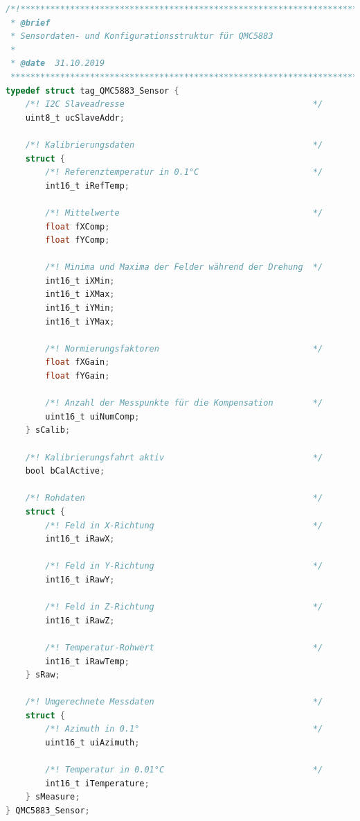             \begin{lstlisting}[language=C,caption={Typdefinition für die Sensordatenstruktur des QMC5883L},label=lst:qmc5883_typedef]
/*!****************************************************************************
 * @brief
 * Sensordaten- und Konfigurationsstruktur für QMC5883
 *
 * @date  31.10.2019
 ******************************************************************************/
typedef struct tag_QMC5883_Sensor {
    /*! I2C Slaveadresse                                      */
    uint8_t ucSlaveAddr;
    
    /*! Kalibrierungsdaten                                    */
    struct {
        /*! Referenztemperatur in 0.1°C                       */
        int16_t iRefTemp;
        
        /*! Mittelwerte                                       */
        float fXComp;
        float fYComp;
        
        /*! Minima und Maxima der Felder während der Drehung  */
        int16_t iXMin;
        int16_t iXMax;
        int16_t iYMin;
        int16_t iYMax;
        
        /*! Normierungsfaktoren                               */
        float fXGain;
        float fYGain;
        
        /*! Anzahl der Messpunkte für die Kompensation        */
        uint16_t uiNumComp;
    } sCalib;
    
    /*! Kalibrierungsfahrt aktiv                              */
    bool bCalActive;
    
    /*! Rohdaten                                              */
    struct {
        /*! Feld in X-Richtung                                */
        int16_t iRawX;
        
        /*! Feld in Y-Richtung                                */
        int16_t iRawY;
        
        /*! Feld in Z-Richtung                                */
        int16_t iRawZ;
        
        /*! Temperatur-Rohwert                                */
        int16_t iRawTemp;
    } sRaw;
    
    /*! Umgerechnete Messdaten                                */
    struct {
        /*! Azimuth in 0.1°                                   */
        uint16_t uiAzimuth;
        
        /*! Temperatur in 0.01°C                              */
        int16_t iTemperature;
    } sMeasure;
} QMC5883_Sensor;
            \end{lstlisting}
        
